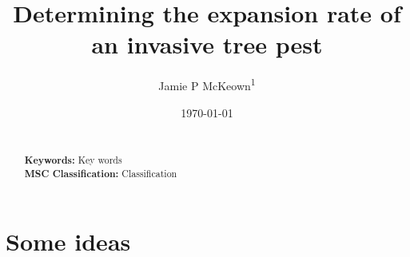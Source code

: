 \documentclass[9pt, reqno]{amsart}
\numberwithin{equation}{section}
\renewcommand{\(}{\left(}
\renewcommand{\)}{\right)}
\theoremstyle{definition}
\theoremstyle{definition}
\theoremstyle{definition}
\newcommand{\draft}[1]{\textcolor{draftcol}{#1}}
\begin{document}
\title{Determining the expansion rate of an invasive tree pest}

\author[JP McKeown]{Jamie P McKeown\textsuperscript{1}}
\address[A1]{School of Mathematics, Statistics, and Physics, Newcastle University, Newcastle upon Tyne, UK.}

\date{\today}
\maketitle 

\begin{abstract}
 \centering \bigskip
  \begin{minipage}{\dimexpr\paperwidth-10cm}
 	\draft{\lipsum[1]}  \\
	
 	\bigskip
 	\noindent\textbf{Keywords:} \draft{Key words}\\
	
 	\bigskip
 	\noindent\textbf{MSC Classification:} \draft{Classification} \\	
 \end{minipage} 
 \end{abstract} 




\section*{Some ideas}
\end{document}
